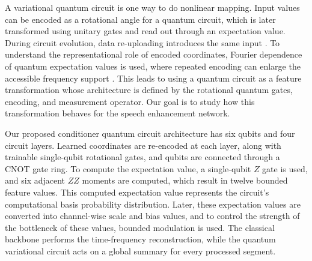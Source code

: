 \documentclass[10pt,a4paper]{article}
\begin{document}
A variational quantum circuit is one way to do nonlinear mapping. Input values can be encoded as a rotational angle for a quantum circuit, which is later transformed using unitary gates and read out through an expectation value. During circuit evolution, data re-uploading introduces the same input \cite{re-upload}. To understand the representational role of encoded coordinates, Fourier dependence of quantum expectation values is used, where repeated encoding can enlarge the accessible frequency support \cite{fourier}. This leads to using a quantum circuit as a feature transformation whose architecture is defined by the rotational quantum gates, encoding, and measurement operator. Our goal is to study how this transformation behaves for the speech enhancement network.


Our proposed conditioner quantum circuit architecture has six qubits and four circuit layers. Learned coordinates are re-encoded at each layer, along with trainable single-qubit rotational gates, and qubits are connected through a CNOT gate ring. To compute the expectation value, a single-qubit $Z$ gate is used, and six adjacent $ZZ$ moments are computed, which result in twelve bounded feature values. This computed expectation value represents the circuit's computational basis probability distribution. Later, these expectation values are converted into channel-wise scale and bias values, and to control the strength of the bottleneck of these values, bounded modulation is used. The classical backbone performs the time-frequency reconstruction, while the quantum variational circuit acts on a global summary for every processed segment.

\end{document}
